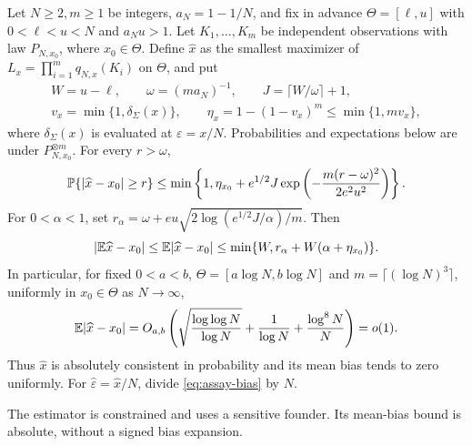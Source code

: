 \begin{theorem}\label{thm:assay-mle}
Let $N\ge2,m\ge1$ be integers, $a_N=1-1/N$, and fix in advance
$\Theta=[\ell,u]$ with $0<\ell<u<N$ and $a_Nu>1$.
Let $K_1,\ldots,K_m$ be independent observations with law $P_{N,x_0}$,
where $x_0\in\Theta$. Define $\widehat x$ as the smallest maximizer of
$L_x=\prod_{i=1}^m q_{N,x}(K_i)$ on $\Theta$, and put
\[
 \begin{gathered}
 W=u-\ell,\qquad \omega=(ma_N)^{-1},\qquad
 J=\lceil W/\omega\rceil+1,\\
 v_x=\min\{1,\delta_\Sigma(x)\},\qquad
 \eta_x=1-(1-v_x)^m\le\min\{1,mv_x\},
 \end{gathered}
\]
where $\delta_\Sigma(x)$ is evaluated at $\varepsilon=x/N$.
Probabilities and expectations below are under $P_{N,x_0}^{\otimes m}$.
For every $r>\omega$,
\begin{equation}\label{eq:assay-tail}
 \mathbb{P}\{|\widehat x-x_0|\ge r\}
 \le\min\left\{1,\eta_{x_0}+e^{1/2}J
       \exp\left(-\frac{m(r-\omega)^2}{2e^2u^2}\right)\right\}.
\end{equation}
For $0<\alpha<1$, set
$r_\alpha=\omega+eu\sqrt{2\log(e^{1/2}J/\alpha)/m}$. Then
\begin{equation}\label{eq:assay-bias}
 |\mathbb{E}\widehat x-x_0|\le\mathbb{E}|\widehat x-x_0|
 \le\min\{W,r_\alpha+W(\alpha+\eta_{x_0})\}.
\end{equation}
In particular, for fixed $0<a<b$, $\Theta=[a\log N,b\log N]$ and
$m=\lceil(\log N)^3\rceil$, uniformly in $x_0\in\Theta$ as $N\to\infty$,
\[
 \mathbb{E}|\widehat x-x_0|
 =O_{a,b}\left(\sqrt{\frac{\log\log N}{\log N}}
              +\frac1{\log N}+\frac{\log^8N}{N}\right)=o(1).
\]
Thus $\widehat x$ is absolutely consistent in probability and its mean
bias tends to zero uniformly. For $\widehat\varepsilon=\widehat x/N$,
divide \eqref{eq:assay-bias} by $N$.
\end{theorem}

The estimator is constrained and uses a sensitive founder. Its mean-bias
bound is absolute, without a signed bias expansion.

